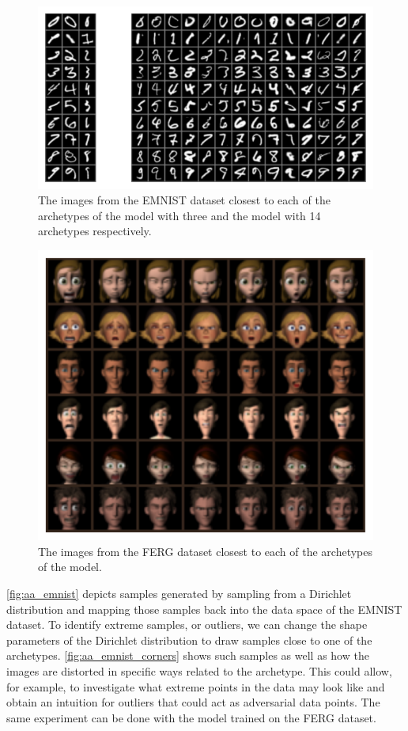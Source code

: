 \begin{figure}[htpb]
	\centering
	\includegraphics{figures/samples/archetypes_emnist.pdf}
	\caption{The images from the EMNIST dataset closest to each of the
		archetypes of the model with three and the model with 14 archetypes
		respectively.}%
	\label{fig:emnist_aa_closest}
\end{figure}

\begin{figure}[htpb]
	\centering
	\includegraphics{figures/samples/archetypes_ferg_7.pdf}
	\caption{The images from the FERG dataset closest to each of the
		archetypes of the model.}%
	\label{fig:ferg_aa_closest}
\end{figure}

\autoref{fig:aa_emnist} depicts samples generated by sampling from a
Dirichlet distribution and mapping those samples back into the data space of
the EMNIST dataset. To identify extreme samples, or outliers, we can
change the shape parameters of the Dirichlet distribution to draw samples close
to one of the archetypes. \autoref{fig:aa_emnist_corners} shows such samples as
well as how the images are distorted in specific ways
related to the archetype. This could allow, for example, to investigate what
extreme points in the data may look like and obtain an intuition for outliers
that could act as adversarial data points.
The same experiment can be done with the model trained on the FERG dataset.

